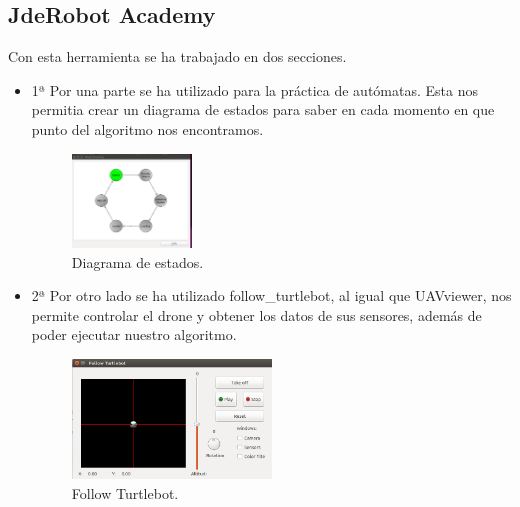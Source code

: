 \subsection{JdeRobot Academy}
\hspace{1 cm} Con esta herramienta se ha trabajado en dos secciones.
\begin{itemize}
\item 1ª Por una parte se ha utilizado para la pr\'actica de aut\'omatas. Esta nos permitia crear un diagrama de estados para saber en cada momento en que punto del algoritmo nos encontramos.

\begin{figure}[ht]
	\centering
		\includegraphics[width=0.3\textwidth]{imgs/states.eps}
		\caption{Diagrama de estados.}
	\label{fig:Diag_estados}
\end{figure}

\item 2ª Por otro lado se ha utilizado follow\_turtlebot, al igual que UAVviewer, nos permite controlar el drone y obtener los datos de sus sensores, adem\'as de poder ejecutar nuestro algoritmo.
 \begin{figure}[H]
	\centering
		\includegraphics[width=0.5\textwidth]{imgs/follow_turtlebot.png}
		\caption{Follow Turtlebot.}
	\label{fig:FollowTurtlebot}
\end{figure}


\end{itemize}

